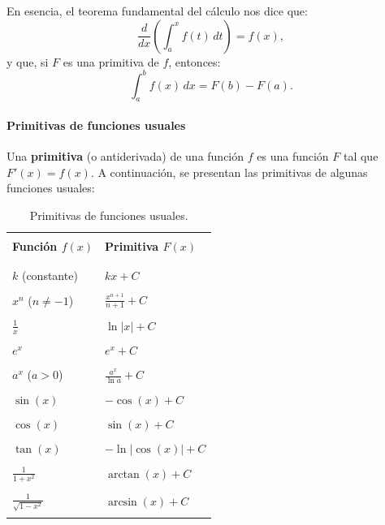 \documentclass[12pt, a4paper]{article}
\theoremstyle{rioplatense}
\begin{document}
En esencia, el teorema fundamental del cálculo nos dice que:
\[
\frac{d}{dx} \left( \int_a^x f(t) \, dt \right) = f(x),
\]
y que, si \( F \) es una primitiva de \( f \), entonces:
\[
\int_a^b f(x) \, dx = F(b) - F(a).
\]

\paragraph{Primitivas de funciones usuales}

Una \textbf{primitiva} (o antiderivada) de una función \( f \) es una función \( F \) tal que \( F'(x) = f(x) \). A continuación, se presentan las primitivas de algunas funciones usuales:

\begin{table}[h]
\centering
\caption{Primitivas de funciones usuales.}
\begin{tabular}{ll}\\
\toprule \\
\textbf{Función \( f(x) \)} & \textbf{Primitiva \( F(x) \)} \\ \\
\midrule \\
\( k \) (constante) & \( kx + C \) \\ \\
\( x^n \) (\( n \neq -1 \)) & \( \frac{x^{n+1}}{n+1} + C \) \\ \\
\( \frac{1}{x} \) & \( \ln|x| + C \) \\ \\
\( e^x \) & \( e^x + C \) \\ \\
\( a^x \) (\( a > 0 \)) & \( \frac{a^x}{\ln a} + C \) \\ \\
\( \sin(x) \) & \( -\cos(x) + C \) \\ \\
\( \cos(x) \) & \( \sin(x) + C \) \\ \\
\( \tan(x) \) & \( -\ln|\cos(x)| + C \) \\ \\
\( \displaystyle \frac{1}{1+x^2} \) & \( \arctan(x) + C \) \\ \\
\( \displaystyle \frac{1}{\sqrt{1-x^2}} \) & \( \arcsin(x) + C \) \\ \\
\bottomrule
\end{tabular}
\end{table}
\end{document}
